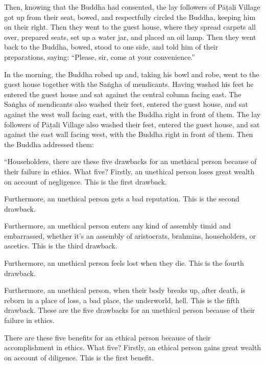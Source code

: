 \documentclass[12pt,openany]{book}%
\begin{document}
Then, knowing that the Buddha had consented, the lay followers of \textsanskrit{Pāṭali} Village got up from their seat, bowed, and respectfully circled the Buddha, keeping him on their right. Then they went to the guest house, where they spread carpets all over, prepared seats, set up a water jar, and placed an oil lamp. Then they went back to the Buddha, bowed, stood to one side, and told him of their preparations, saying: “Please, sir, come at your convenience.” 

In the morning, the Buddha robed up and, taking his bowl and robe, went to the guest house together with the \textsanskrit{Saṅgha} of mendicants. Having washed his feet he entered the guest house and sat against the central column facing east. The \textsanskrit{Saṅgha} of mendicants also washed their feet, entered the guest house, and sat against the west wall facing east, with the Buddha right in front of them. The lay followers of \textsanskrit{Pāṭali} Village also washed their feet, entered the guest house, and sat against the east wall facing west, with the Buddha right in front of them. Then the Buddha addressed them: 

“Householders, there are these five drawbacks for an unethical person because of their failure in ethics. What five? Firstly, an unethical person loses great wealth on account of negligence. This is the first drawback. 

Furthermore, an unethical person gets a bad reputation. This is the second drawback. 

Furthermore, an unethical person enters any kind of assembly timid and embarrassed, whether it’s an assembly of aristocrats, brahmins, householders, or ascetics. This is the third drawback. 

Furthermore, an unethical person feels lost when they die. This is the fourth drawback. 

Furthermore, an unethical person, when their body breaks up, after death, is reborn in a place of loss, a bad place, the underworld, hell. This is the fifth drawback. These are the five drawbacks for an unethical person because of their failure in ethics. 

There are these five benefits for an ethical person because of their accomplishment in ethics. What five? Firstly, an ethical person gains great wealth on account of diligence. This is the first benefit. 
\end{document}
